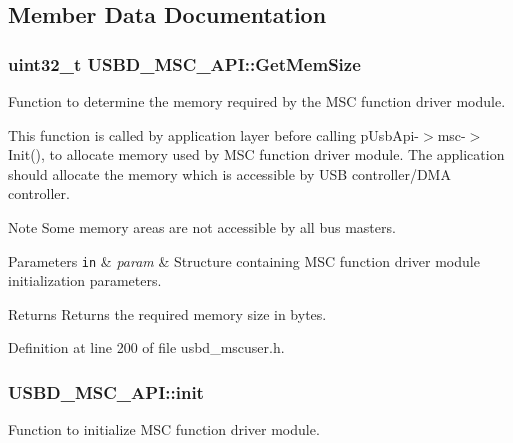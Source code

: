 \subsection{Member Data Documentation}
\subsubsection[{\texorpdfstring{Get\+Mem\+Size}{GetMemSize}}]{\setlength{\rightskip}{0pt plus 5cm}uint32\+\_\+t U\+S\+B\+D\+\_\+\+M\+S\+C\+\_\+\+A\+P\+I\+::\+Get\+Mem\+Size}\hypertarget{structUSBD__MSC__API_a73a9d240b20fcd83e6d2c9675420d626}{}\label{structUSBD__MSC__API_a73a9d240b20fcd83e6d2c9675420d626}
Function to determine the memory required by the M\+SC function driver module.

This function is called by application layer before calling p\+Usb\+Api-\/$>$msc-\/$>$Init(), to allocate memory used by M\+SC function driver module. The application should allocate the memory which is accessible by U\+SB controller/\+D\+MA controller. \begin{DoxyNote}{Note}
Some memory areas are not accessible by all bus masters.
\end{DoxyNote}

\begin{DoxyParams}[1]{Parameters}
\mbox{\tt in}  & {\em param} & Structure containing M\+SC function driver module initialization parameters. \\
\hline
\end{DoxyParams}
\begin{DoxyReturn}{Returns}
Returns the required memory size in bytes. 
\end{DoxyReturn}


Definition at line 200 of file usbd\+\_\+mscuser.\+h.

\subsubsection[{\texorpdfstring{init}{init}}]{ U\+S\+B\+D\+\_\+\+M\+S\+C\+\_\+\+A\+P\+I\+::init}\hypertarget{structUSBD__MSC__API_a2654b01293392f8a58412e88b46f1e91}{}\label{structUSBD__MSC__API_a2654b01293392f8a58412e88b46f1e91}
Function to initialize M\+SC function driver module.

